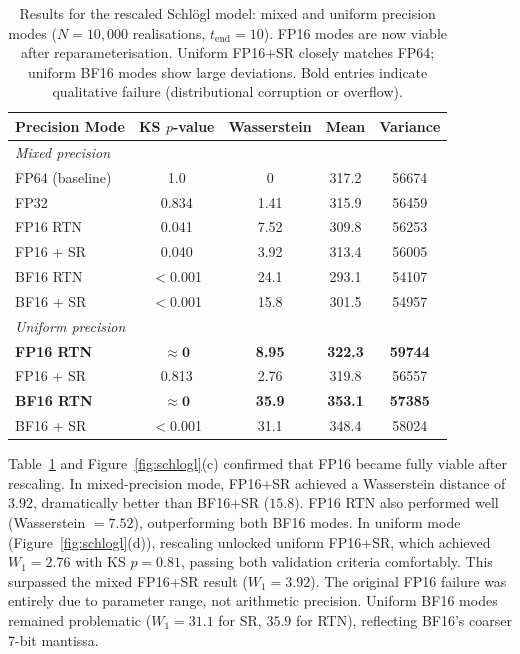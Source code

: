 \documentclass{article}
\begin{document}
\begin{table}[ht]
    \centering
    \begin{tabular}{@{}lcccc@{}}
        \toprule
        Precision Mode & KS $p$-value & Wasserstein & Mean & Variance \\
        \midrule
        \multicolumn{5}{l}{\textit{Mixed precision}} \\
        \midrule
        FP64 (baseline)   & 1.0    & 0      & 317.2 & 56674 \\
        FP32              & 0.834  & 1.41   & 315.9 & 56459 \\
        FP16 RTN          & 0.041  & 7.52   & 309.8 & 56253 \\
        FP16 + SR         & 0.040  & 3.92   & 313.4 & 56005 \\
        BF16 RTN          & $<$0.001 & 24.1 & 293.1 & 54107 \\
        BF16 + SR         & $<$0.001 & 15.8 & 301.5 & 54957 \\
        \midrule
        \multicolumn{5}{l}{\textit{Uniform precision}} \\
        \midrule
        \textbf{FP16 RTN} & $\mathbf{\approx 0}$ & \textbf{8.95} & \textbf{322.3} & \textbf{59744} \\
        FP16 + SR  & 0.813  & 2.76   & 319.8 & 56557 \\
        \textbf{BF16 RTN} & $\mathbf{\approx 0}$ & \textbf{35.9} & \textbf{353.1} & \textbf{57385} \\
        BF16 + SR  & $<$0.001 & 31.1 & 348.4 & 58024 \\
        \bottomrule
    \end{tabular}
    \caption{Results for the rescaled Schl\"{o}gl model: mixed and uniform precision modes ($N = 10{,}000$ realisations, $t_{\mathrm{end}} = 10$). FP16 modes are now viable after reparameterisation. Uniform FP16+SR closely matches FP64; uniform BF16 modes show large deviations. Bold entries indicate qualitative failure (distributional corruption or overflow).}
    \label{tab:schlogl-rescaled}
\end{table}


Table~\ref{tab:schlogl-rescaled} and Figure~\ref{fig:schlogl}(c) confirmed that FP16 became fully viable after rescaling. In mixed-precision mode, FP16+SR achieved a Wasserstein distance of $3.92$, dramatically better than BF16+SR ($15.8$). FP16 RTN also performed well (Wasserstein $= 7.52$), outperforming both BF16 modes. In uniform mode (Figure~\ref{fig:schlogl}(d)), rescaling unlocked uniform FP16+SR, which achieved $W_1 = 2.76$ with KS $p = 0.81$, passing both validation criteria comfortably. This surpassed the mixed FP16+SR result ($W_1 = 3.92$). The original FP16 failure was entirely due to parameter range, not arithmetic precision. Uniform BF16 modes remained problematic ($W_1 = 31.1$ for SR, $35.9$ for RTN), reflecting BF16's coarser 7-bit mantissa.
\end{document}
